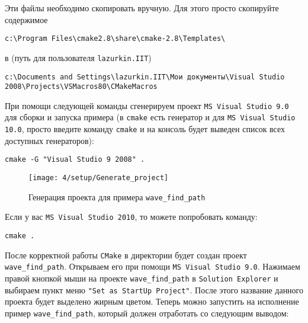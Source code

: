 Эти файлы необходимо скопировать вручную. Для этого просто скопируйте
содержимое

{\footnotesize
\begin{framed}
\begin{verbatim}
c:\Program Files\cmake2.8\share\cmake-2.8\Templates\
\end{verbatim}
\end{framed}
}

в (путь для пользователя \texttt{lazurkin.IIT})

{\scriptsize
\begin{framed}
\begin{verbatim}
c:\Documents and Settings\lazurkin.IIT\Мои документы\Visual Studio 2008\Projects\VSMacros80\CMakeMacros
\end{verbatim}
\end{framed}
}

При помощи следующей команды сгенерируем проект \texttt{MS Visual
  Studio 9.0} для сборки и запуска примера (в \texttt{cmake} есть
генератор и для \texttt{MS Visual Studio 10.0}, просто введите команду
\texttt{cmake} и на консоль будет выведен список всех доступных
генераторов):

\begin{framed}
\begin{verbatim}
cmake -G "Visual Studio 9 2008" .
\end{verbatim}
\end{framed}

\begin{figure}[h!]
  \centering
  \texttt{[image: 4/setup/Generate\_project]}
  \caption{Генерация проекта для примера \texttt{wave\_find\_path}}
  \label{fig:gen_project}
\end{figure}

Если у вас \texttt{MS Visual Studio 2010}, то можете попробовать
команду:

\begin{framed}
\begin{verbatim}
cmake .
\end{verbatim}
\end{framed}

После корректной работы \texttt{CMake} в директории будет создан
проект \verb|wave_find_path|. Открываем его при помощи \texttt{MS
  Visual Studio 9.0}. Нажимаем правой кнопкой мыши на проекте
\verb|wave_find_path| в \texttt{Solution Explorer} и выбираем пункт
меню \texttt{"Set as StartUp Project"}. После этого название данного
проекта будет выделено жирным цветом. Теперь можно запустить на
исполнение пример \verb|wave_find_path|, который должен отработать со
следующим выводом:

